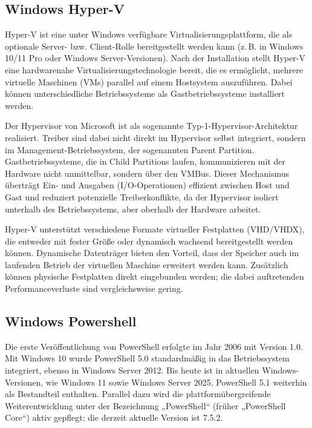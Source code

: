 \documentclass[a4paper,12pt]{article}
\begin{document}
\subsection{Windows Hyper-V}


Hyper-V ist eine unter Windows verfügbare Virtualisierungsplattform, die als optionale Server- bzw. Client-Rolle bereitgestellt werden kann (z. B. in Windows 10/11 Pro oder Windows Server-Versionen). Nach der Installation stellt Hyper-V eine hardware­nahe Virtualisierungstechnologie bereit, die es ermöglicht, mehrere virtuelle Maschinen (VMs) parallel auf einem Hostsystem auszuführen. Dabei können unterschiedliche Betriebssysteme als Gastbetriebssysteme installiert werden.

Der Hypervisor von Microsoft ist als sogenannte Typ‑1-Hypervisor-Architektur realisiert. Treiber sind dabei nicht direkt im Hypervisor selbst integriert, sondern im Management-Betriebssystem, der sogenannten Parent Partition. Gastbetriebssysteme, die in Child Partitions laufen, kommunizieren mit der Hardware nicht unmittelbar, sondern über den VMBus. Dieser Mechanismus überträgt Ein- und Ausgaben (I/O-Operationen) effizient zwischen Host und Gast und reduziert potenzielle Treiberkonflikte, da der Hypervisor isoliert unterhalb des Betriebssystems, aber oberhalb der Hardware arbeitet.

Hyper-V unterstützt verschiedene Formate virtueller Festplatten (VHD/VHDX), die entweder mit fester Größe oder dynamisch wachsend bereitgestellt werden können. Dynamische Datenträger bieten den Vorteil, dass der Speicher auch im laufenden Betrieb der virtuellen Maschine erweitert werden kann. Zusätzlich können physische Festplatten direkt eingebunden werden; die dabei auftretenden Performanceverluste sind vergleichsweise gering.\cite{}\\




\subsection{Windows Powershell}

Die erste Veröffentlichung von PowerShell erfolgte im Jahr 2006 mit Version 1.0. Mit Windows 10 wurde PowerShell 5.0 standardmäßig in das Betriebssystem integriert, ebenso in Windows Server 2012. Bis heute ist in aktuellen Windows-Versionen, wie Windows 11 sowie Windows Server 2025, PowerShell 5.1 weiterhin als Bestandteil enthalten. Parallel dazu wird die plattformübergreifende Weiterentwicklung unter der Bezeichnung „PowerShell“ (früher „PowerShell Core“) aktiv gepflegt; die derzeit aktuelle Version ist 7.5.2.
\end{document}
